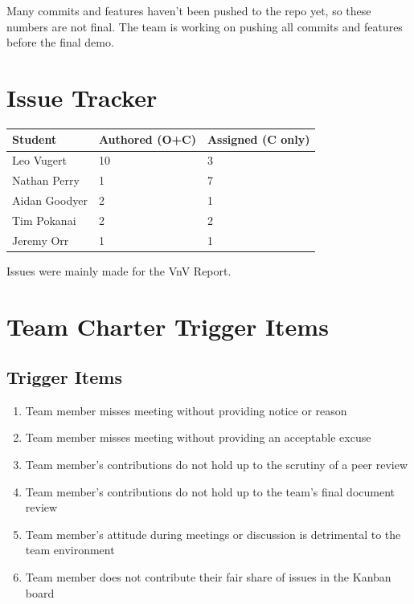 \documentclass{article}
\begin{document}
Many commits and features haven't been pushed to the repo yet, so these numbers are not final.  The team is working on
pushing all commits and features before the final demo.

\section{Issue Tracker}

\begin{table}[H]
\centering
\begin{tabular}{lll}
\toprule
\textbf{Student} & \textbf{Authored (O+C)} & \textbf{Assigned (C only)}\\
\midrule
Leo Vugert & 10 & 3 \\
Nathan Perry & 1 & 7 \\
Aidan Goodyer & 2 & 1 \\
Tim Pokanai & 2 & 2 \\
Jeremy Orr & 1 & 1 \\
\bottomrule
\end{tabular}
\end{table}

Issues were mainly made for the VnV Report.


\section{Team Charter Trigger Items}

\subsection{Trigger Items}
\begin{enumerate}
    \item{Team member misses meeting without providing notice or reason}
    \item{Team member misses meeting without providing an acceptable excuse}
    \item{Team member's contributions do not hold up to the scrutiny of a peer review}
    \item{Team member's contributions do not hold up to the team's final document review}
    \item{Team member's attitude during meetings or discussion is detrimental to the team environment}
    \item{Team member does not contribute their fair share of issues in the Kanban board}
\end{enumerate}
\end{document}
